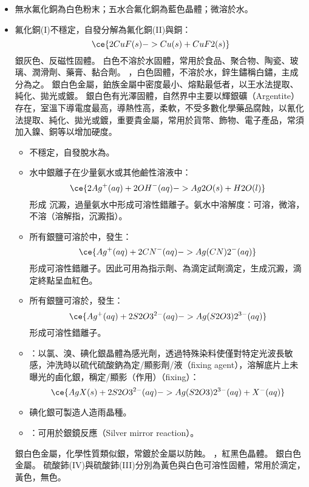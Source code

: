 \documentclass[a4paper,12pt]{report}
\begin{document}
\begin{itemize}
\bit
\item 無水氟化銅為白色粉末；五水合氟化銅為藍色晶體；微溶於水。
\item 氟化銅(I)不穩定，自發分解為氟化銅(II)與銅：
\[\ce{2CuF(s) -> Cu(s) + CuF2(s)}\]
\eit
{}
銀灰色、反磁性固體。
白色不溶於水固體，常用於食品、聚合物、陶瓷、玻璃、潤滑劑、藥膏、黏合劑。
，白色固體，不溶於水，鋅生鏽稱白鏽，主成分為之。
銀白色金屬，鉑族金屬中密度最小、熔點最低者，以王水法提取、純化、拋光或鍍。
銀白色有光澤固體，自然界中主要以輝銀礦（Argentite）存在，室溫下導電度最高，導熱性高，柔軟，不受多數化學藥品腐蝕，以氰化法提取、純化、拋光或鍍，重要貴金屬，常用於貨幣、飾物、電子產品，常須加入鎳、銅等以增加硬度。
\begin{itemize}
\item {}不穩定，自發脫水為。
\item 水中銀離子在少量氨水或其他鹼性溶液中：
\[\ce{2Ag^+(aq) + 2OH^-(aq) -> Ag2O(s) + H2O(l)}\]
形成 沉澱，過量氨水中形成可溶性錯離子。氨水中溶解度：可溶，微溶，不溶（溶解指，沉澱指）。
\item 所有銀鹽可溶於中，發生：
\[\ce{Ag^+(aq) + 2CN^-(aq) -> Ag(CN)2^-(aq)}\]
形成可溶性錯離子。因此可用為指示劑、為滴定試劑滴定，生成沉澱，滴定終點呈血紅色。
\item 所有銀鹽可溶於，發生：
\[\ce{Ag^+(aq) + 2S2O3^{2-}(aq) -> Ag(S2O3)2^{3-}(aq)}\]
形成可溶性錯離子。
\item {}：以氯、溴、碘化銀晶體為感光劑，透過特殊染料使僅對特定光波長敏感，沖洗時以硫代硫酸鈉為定/顯影劑/液（fixing agent），溶解底片上未曝光的鹵化銀，稱定/顯影（作用）（fixing）：
\[\ce{AgX(s) + 2S2O3^{2-}(aq) -> Ag(S2O3)2^{3-}(aq) + X^-(aq)}\]
\item 碘化銀可製造人造雨晶種。
\item {}：可用於銀鏡反應（Silver mirror reaction）。
\end{itemize}
銀白色金屬，化學性質類似銀，常鍍於金屬以防蝕。
，紅黑色晶體。
銀白色金屬。
硫酸鈰(IV)與硫酸鈰(III)分別為黃色與白色可溶性固體，常用於滴定，黃色，無色。

\end{itemize}
\end{document}
